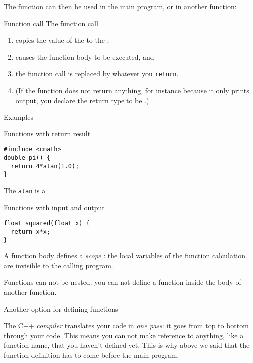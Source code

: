 The function can then be used in the main program, or in another function:
\begin{block}{Function call}
  \label{sl:func-call}
  The function call
  \begin{enumerate}
  \item copies the value of the 
    to the ;
  \item causes the function body to be executed, and
  \item the function call is replaced by whatever you \lstinline{return}.
  \item (If the function does not return anything, for instance because
    it only prints output, you declare the return type to be .)
  \end{enumerate}
\end{block}

 {Examples}

\begin{block}{Functions with return result}
  \label{sl:func-return}
\begin{lstlisting}
#include <cmath>
double pi() {
  return 4*atan(1.0);
}
\end{lstlisting}
The \lstinline{atan} is a 
\end{block}

\begin{block}{Functions with input and output}
  \label{sl:func-param-return}
\begin{lstlisting}
float squared(float x) {
  return x*x;
}
\end{lstlisting}
\end{block}

A function body defines a
%
\emph{scope}%
:
the local variables of the function calculation are invisible to the
calling program.

Functions can not be nested: you can not define a function inside the
body of another function.

 {Another option for defining functions}

The C++ \emph{compiler} translates your code in
\emph{one pass}: it goes from top to
bottom through your code. This means you can not make reference to
anything, like a function name, that you haven't defined yet.
This is why above we said that the function definition has to come
before the main program.

